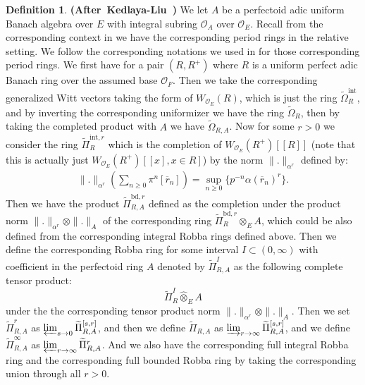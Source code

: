\documentclass[12pt]{amsart}
\theoremstyle{definition}
\newtheorem{definition}[theorem]{Definition}
\numberwithin{equation}{section}
\begin{document}
\begin{definition} \mbox{\bf{(After Kedlaya-Liu \cite[Definition 4.1.1]{KL2})}}
We let $A$ be a perfectoid adic uniform Banach algebra over $E$ with integral subring $\mathcal{O}_A$ over $\mathcal{O}_E$. Recall from the corresponding context in \cite{KL1} we have the corresponding period rings in the relative setting. We follow the corresponding notations we used in \cite[Section 2.1]{T2} for those corresponding period rings. We first have for a pair $(R,R^+)$ where $R$ is a uniform perfect adic Banach ring over the assumed base $\mathcal{O}_F$. Then we take the corresponding generalized Witt vectors taking the form of $W_{\mathcal{O}_E}(R)$, which is just the ring $\widetilde{\Omega}_R^\mathrm{int}$, and by inverting the corresponding uniformizer we have the ring $\widetilde{\Omega}_R$, then by taking the completed product with $A$ we have $\widetilde{\Omega}_{R,A}$. Now for some $r>0$ we consider the ring $\widetilde{\Pi}^{\mathrm{int},r}_{R}$ which is the completion of $W_{\mathcal{O}_E}(R^+)[[R]]$ (note that this is actually just $W_{\mathcal{O}_E}(R^+)[[x],x\in R]$) by the norm $\|.\|_{\alpha^r}$ defined by:
\begin{align}
\|.\|_{\alpha^r}(\sum_{n\geq 0}\pi^n[\overline{r}_n])=\sup_{n\geq 0}\{p^{-n}\alpha(\overline{r}_n)^r\}.	
\end{align}
Then we have the product $\widetilde{\Pi}^{\mathrm{bd},r}_{R,A}$ defined as the completion under the product norm $\|.\|_{\alpha^r}\otimes \|.\|_A$ of the corresponding ring $\widetilde{\Pi}^{\mathrm{bd},r}_{R}\otimes_{E}A$, which could be also defined from the corresponding integral Robba rings defined above. Then we define the corresponding Robba ring for some interval $I\subset (0,\infty)$ with coefficient in the perfectoid ring $A$ denoted by $\widetilde{\Pi}^{I}_{R,A}$ as the following complete tensor product:
\begin{displaymath}
\widetilde{\Pi}^{I}_{R}\widehat{\otimes}_{E} A	
\end{displaymath}
under the the corresponding tensor product norm $\|.\|_{\alpha^r}\otimes \|.\|_A$. Then we set $\widetilde{\Pi}^r_{R,A}$ as $\varprojlim_{s\rightarrow 0}\widetilde{\Pi}^{[s,r]}_{R,A}$, and then we define $\widetilde{\Pi}_{R,A}$ as $\varinjlim_{r\rightarrow \infty}\widetilde{\Pi}^{[s,r]}_{R,A}$, and we define $\widetilde{\Pi}^\infty_{R,A}$ as $\varprojlim_{r\rightarrow \infty}\widetilde{\Pi}^{r}_{R,A}$. And we also have the corresponding full integral Robba ring and the corresponding full bounded Robba ring by taking the corresponding union through all $r>0$.
\end{definition}
\end{document}
